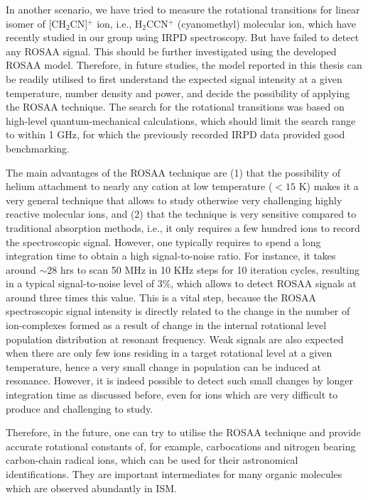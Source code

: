 In another scenario, we have tried to measure the rotational transitions for linear isomer of [CH$_2$CN]$^+$ ion, i.e., H$_2$CCN$^+$ (cyanomethyl) molecular ion, which have recently studied in our group using IRPD spectroscopy. But have failed to detect any ROSAA signal. This should be further investigated using the developed ROSAA model. Therefore, in future studies, the model reported in this thesis can be readily utilised to first understand the expected signal intensity at a given temperature, number density and power, and decide the possibility of applying the ROSAA technique. The search for the rotational transitions was based on high-level quantum-mechanical calculations, which should limit the search range to within 1 GHz, for which the previously recorded IRPD data provided good benchmarking.

The main advantages of the ROSAA technique are (1) that the possibility of helium attachment to nearly any cation at 
low temperature ($< 15$ K) makes it a very general technique that allows to study otherwise very challenging highly reactive molecular ions, 
and (2) that the technique is very sensitive compared to traditional absorption methods, 
i.e., it only requires a few hundred ions to record the spectroscopic signal.
However, one typically requires to spend a long integration time
to obtain a high signal-to-noise ratio. For instance, it takes around $\sim 28$ hrs to scan 50 MHz in 10 KHz steps for 10 iteration cycles, resulting in a typical signal-to-noise level of $3 \%$, which allows to detect ROSAA signals at around three times this value. This is a vital step, because 
the ROSAA spectroscopic signal intensity is directly related to the change in the number of ion-complexes 
formed as a result of change in the internal rotational level population distribution at resonant frequency.
Weak signals are also expected when there are only few ions 
residing in a target rotational level at a given temperature, hence a very small change 
in population can be induced at resonance. However, it is indeed possible to detect 
such small changes by longer integration time as discussed before, even for ions which are very difficult 
to produce and challenging to study.

Therefore, in the future, one can try to utilise the ROSAA technique and provide accurate rotational constants of, 
for example, carbocations and nitrogen bearing carbon-chain radical ions, which can be used for their astronomical 
identifications. They are important intermediates for many organic molecules 
which are observed abundantly in ISM.

